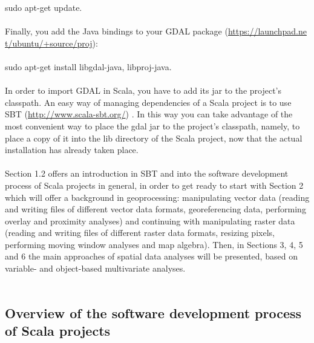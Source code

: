 \documentclass {article}
\begin{document}
sudo apt-get update.\\
\\
Finally, you add the Java bindings to your GDAL package (\href{https://launchpad.net/ubuntu/+source/proj}{https://launchpad.ne\\ t/ubuntu/+source/proj}):\\
\\
sudo apt-get install libgdal-java, libproj-java.    \\
\\
In order to import GDAL in Scala, you have to add its jar to the project's classpath. An easy way of managing dependencies of a Scala project is to use SBT (\href{http://www.scala-sbt.org/}{http://www.scala-sbt.org/}) \cite{tesileanu_using_2017} \cite{suereth_sbt_2016}. In this way you can take advantage of the most convenient way to place the gdal jar to the project's classpath, namely, to place a copy of it into the lib directory of the Scala project, now that the actual installation has already taken place.
\\
\\
Section 1.2 offers an introduction in SBT and into the software development process of Scala projects in general, in order to get ready to start with Section 2 which will offer a background in geoprocessing: manipulating vector data (reading and writing files of different vector data formats, georeferencing data, performing overlay and proximity analyses) and continuing with manipulating raster data (reading and writing files of different raster data formats, resizing pixels, performing moving window analyses and map algebra). 
Then, in Sections 3, 4, 5 and 6 the main approaches of spatial data analyses will be presented, based on variable- and object-based multivariate analyses.     
\\
\\
\subsection{Overview of the software development process of Scala projects}
\end{document}
